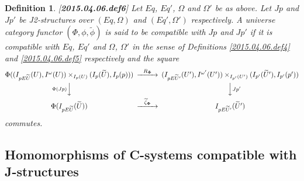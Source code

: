 \documentclass[12pt]{article}
\newtheorem{definition}[proposition]{Definition}
\newcommand{\llabel}[1]{\label{#1}[{\bf #1}]}
\newcommand{\wt}{\widetilde}
\begin{document}
\begin{definition}
\llabel{2015.04.06.def6}
Let $Eq$, $Eq'$, $\Omega$ and $\Omega'$ be as above. Let $Jp$ and $Jp'$ be J2-structures over $(Eq,\Omega)$ and $(Eq',\Omega')$ respectively.  A universe category functor $(\Phi,\phi,\wt{\phi})$ is said to be compatible with $Jp$ and $Jp'$ if it is compatible with $Eq$, $Eq'$ and $\Omega$, $\Omega'$ in the sense of Definitions \ref{2015.04.06.def4} and \ref{2015.04.06.def5} respectively and 
the square
%
$$
\begin{CD}
\Phi((I_{pE\wt{U}}(U), I^{\omega}(U))\times_{I_p(U)} (I_p(\wt{U}), I_p(p))) @>R_{\bf\Phi}>> (I_{pE\wt{U}'}(U'),I^{\omega'}(U'))\times_{I_{p'}(U')}(I_{p'}(\wt{U}'),I_{p'}(p'))\\
@V\Phi(Jp) VV @VVJp' V\\
\Phi(I_{pE\wt{U}}(\wt{U})) @>\wt{\zeta}_{\bf\Phi}>> I_{pE\wt{U}'}(\wt{U}')
\end{CD}
$$
%
commutes. 
\end{definition}













\subsection{Homomorphisms of C-systems compatible with J-structures}
%
\end{document}
